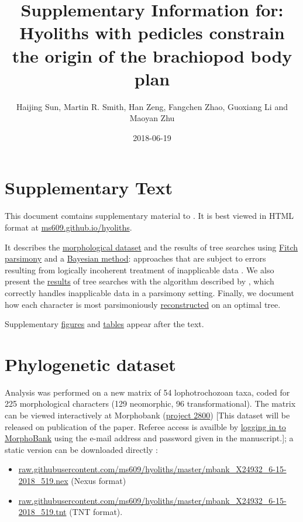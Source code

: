 \documentclass[openany]{book}
\title{Supplementary Information for: \newline\newline Hyoliths with pedicles
constrain the origin of the brachiopod body plan}
\author{Haijing Sun, Martin R. Smith, Han Zeng, Fangchen Zhao, Guoxiang Li and
Maoyan Zhu}
\date{2018-06-19}
\begin{document}
\maketitle

{
\setcounter{tocdepth}{1}
\tableofcontents
}
\chapter*{Supplementary Text}\label{supplementary-text}

This document comtains supplementary material to
\citet{Sun2018Hyolithswith}. It is best viewed in HTML format at
\href{https://ms609.github.io/hyoliths/}{ms609.github.io/hyoliths}.

It describes the \protect\hyperlink{dataset}{morphological dataset} and
the results of tree searches using \protect\hyperlink{fitch}{Fitch
parsimony} and a \protect\hyperlink{bayesian}{Bayesian method}:
approaches that are subject to errors resulting from logically
incoherent treatment of inapplicable data \citep{Maddison1993}. We also
present the \protect\hyperlink{treesearch}{results} of tree searches
with the algorithm described by \citet{Brazeau2018}, which correctly
handles inapplicable data in a parsimony setting. Finally, we document
how each character is most parsimoniously
\protect\hyperlink{reconstructions}{reconstructed} on an optimal tree.

Supplementary \protect\hyperlink{figures}{figures} and
\protect\hyperlink{table}{tables} appear after the text.

\hypertarget{dataset}{\chapter{Phylogenetic dataset}\label{dataset}}

Analysis was performed on a new matrix of 54 lophotrochozoan taxa, coded
for 225 morphological characters (129 neomorphic, 96 transformational).
The matrix can be viewed interactively at Morphobank
(\href{https://morphobank.org/permalink/?P2800}{project 2800}) {[}This
dataset will be released on publication of the paper. Referee access is
availble by
\href{https://morphobank.org/index.php/LoginReg/form}{logging in to
MorphoBank} using the e-mail address and password given in the
manuscript.{]}; a static version can be downloaded directly :

\begin{itemize}
\item
  \href{https://raw.githubusercontent.com/ms609/hyoliths/master/mbank_X24932_6-15-2018_519.nex}{raw.githubusercontent.com/ms609/hyoliths/master/mbank\_X24932\_6-15-2018\_519.nex}
  (Nexus format)
\item
  \href{https://raw.githubusercontent.com/ms609/hyoliths/master/mbank_X24932_6-15-2018_519.tnt}{raw.githubusercontent.com/ms609/hyoliths/master/mbank\_X24932\_6-15-2018\_519.tnt}
  (TNT format).
\end{itemize}
\end{document}
